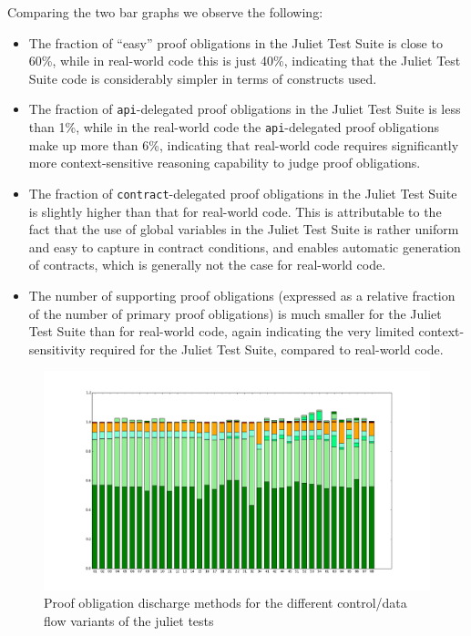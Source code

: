 \documentclass[11pt]{article}
\begin{document}
Comparing the two bar graphs we observe the following:
\begin{itemize}
\item  The fraction of ``easy'' proof obligations in the Juliet Test Suite is close to 60\%,
while in real-world code this is just 40\%, indicating that the Juliet Test Suite code
is considerably simpler in terms of constructs used.
\item The fraction of {\tt api}-delegated proof obligations in the Juliet Test Suite is less
than 1\%, while in the real-world code the {\tt api}-delegated proof obligations make up
more than 6\%, indicating that real-world code requires significantly more context-sensitive
reasoning capability to judge proof obligations.
\item The fraction of {\tt contract}-delegated proof obligations in the Juliet Test Suite
is slightly higher than that for real-world code. This is attributable to the fact that the use of global
variables in the Juliet Test Suite is rather uniform and easy to capture in contract 
conditions, and enables automatic 
generation of contracts, which is generally not the case for real-world code.
\item The number of supporting proof obligations (expressed as a relative fraction of the
number of primary proof obligations) is much smaller for the Juliet Test Suite than for 
real-world code, again indicating the very limited context-sensitivity required for the
Juliet Test Suite, compared to real-world code.
\end{itemize}

\begin{figure}[h]
\begin{center}
\includegraphics[width=\textwidth]{juliet_variants_fractions.png}
\end{center}
\caption{\label{fig:julietvariants}Proof obligation discharge methods for the different
control/data flow variants of the juliet tests}
\end{figure}
\end{document}
